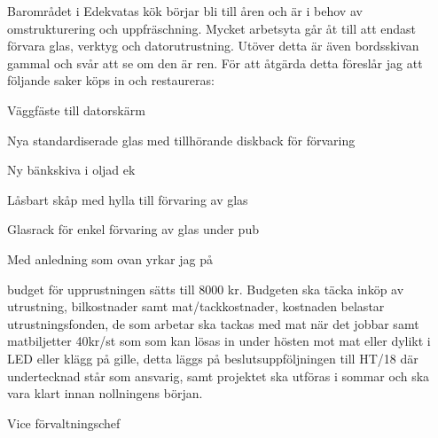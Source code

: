 \documentclass[../_main/handlingar.tex]{subfiles}
\begin{document}
Barområdet i Edekvatas kök börjar bli till åren och är i behov av omstrukturering och uppfräschning. Mycket arbetsyta går åt till att endast förvara glas, verktyg och datorutrustning. Utöver detta är även bordsskivan gammal och svår att se om den är ren. För att åtgärda detta föreslår jag att följande saker köps in och restaureras:
\begin{dashlist}
    \item Väggfäste till datorskärm
    \item Nya standardiserade glas med tillhörande diskback för förvaring
    \item Ny bänkskiva i oljad ek
    \item Låsbart skåp med hylla till förvaring av glas
    \item Glasrack för enkel förvaring av glas under pub
\end{dashlist}

Med anledning som ovan yrkar jag på
\begin{attsatser}
    \att budget för upprustningen sätts till 8000 kr. Budgeten ska täcka inköp av utrustning, bilkostnader samt mat/tackkostnader,
    \att kostnaden belastar utrustningsfonden,
    \att de som arbetar ska tackas med mat när det jobbar samt matbiljetter 40kr/st som som kan lösas in under hösten mot mat eller dylikt i LED eller klägg på gille,
    \att detta läggs på beslutsuppföljningen till HT/18 där undertecknad står som ansvarig, samt
    \att projektet ska utföras i sommar och ska vara klart innan nollningens början.
\end{attsatser}

\begin{signatures}{1}
    \mvh
    \signature{Markus Rahne}{Vice förvaltningschef}
\end{signatures}
\end{document}

